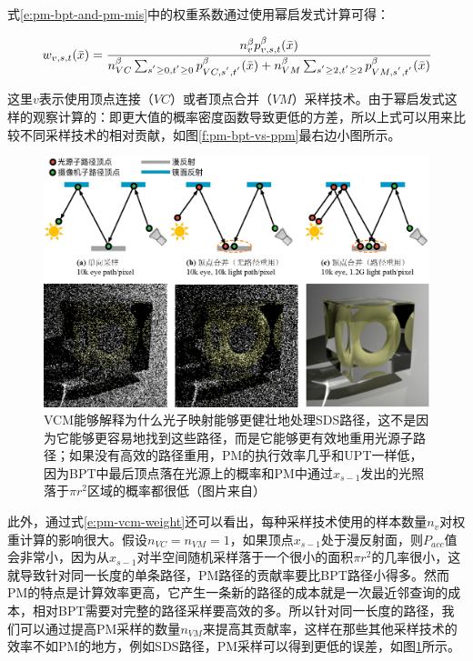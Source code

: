 式\ref{e:pm-bpt-and-pm-mis}中的权重系数通过使用幂启发式计算可得：

\begin{equation}\label{e:pm-vcm-weight}
	w_{v,s,t}(\bar{x})= \cfrac{n^{\beta}_vp^{\beta}_{v,s,t}(\bar{x})}{n^{\beta}_{VC}\sum_{s^{'}\geq 0,t^{'}\geq 0}p^{\beta}_{VC,s^{'},t^{'}}(\bar{x})+n^{\beta}_{VM}\sum_{s^{'}\geq 2,t^{'}\geq 2}p^{\beta}_{VM,s^{'},t^{'}}(\bar{x})}
\end{equation}

\noindent 这里$v$表示使用顶点连接（$VC$）或者顶点合并（$VM$）采样技术。由于幂启发式这样的观察计算的：即更大值的概率密度函数导致更低的方差，所以上式可以用来比较不同采样技术的相对贡献，如图\ref{f:pm-bpt-vs-ppm}最右边小图所示。

\begin{figure}
\begin{fullwidth}
	\includegraphics[width=\thewidth]{figures/pm/path-reuse}
	\caption{VCM能够解释为什么光子映射能够更健壮地处理SDS路径，这不是因为它能够更容易地找到这些路径，而是它能够更有效地重用光源子路径；如果没有高效的路径重用，PM的执行效率几乎和UPT一样低，因为BPT中最后顶点落在光源上的概率和PM中通过$x_{s-1}$发出的光照落于$\pi r^{2}$区域的概率都很低（图片来自\cite{a:LightTransportSimulationwithVertexConnectionandMerging}）}
	\label{f:pm-path-reuse}
\end{fullwidth}
\end{figure}

此外，通过式\ref{e:pm-vcm-weight}还可以看出，每种采样技术使用的样本数量$n_v$对权重计算的影响很大。假设$n_{VC}=n_{VM}=1$，如果顶点$x_{s-1}$处于漫反射面，则$P_{acc}$值会非常小，因为从$x_{s-1}$对半空间随机采样落于一个很小的面积$\pi r^{2}$的几率很小，这就导致针对同一长度的单条路径，PM路径的贡献率要比BPT路径小得多。然而PM的特点是计算效率更高，它产生一条新的路径的成本就是一次最近邻查询的成本，相对BPT需要对完整的路径采样要高效的多。所以针对同一长度的路径，我们可以通过提高PM采样的数量$n_{VM}$来提高其贡献率，这样在那些其他采样技术的效率不如PM的地方，例如SDS路径，PM采样可以得到更低的误差，如图\ref{f:pm-path-reuse}所示。

